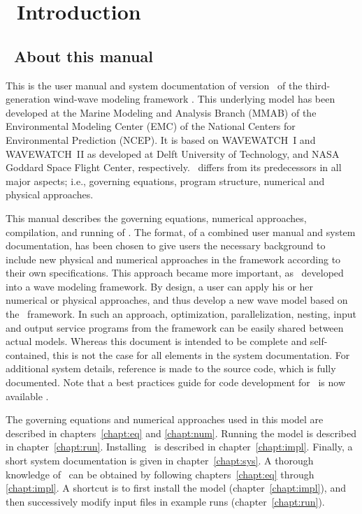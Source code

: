 \section{~Introduction}
\vssub
\subsection{~About this manual}
\vssub

This is the user manual and system documentation of version \WWver\ of the
 third-generation wind-wave modeling framework \ww. This underlying model has
 been developed at the Marine Modeling and Analysis Branch (MMAB) of the
 Environmental Modeling Center (EMC) of the National Centers for Environmental
 Prediction (NCEP). It is based on WAVEWATCH~I and WAVEWATCH~II as developed
 at Delft University of Technology, and NASA Goddard Space Flight Center,
 respectively. \ws\ differs from its predecessors in all major aspects; i.e.,
 governing equations, program structure, numerical and physical
 approaches. %

This manual describes the governing equations, numerical approaches,
compilation, and running of \ws. The format, of a combined user manual and
system documentation, has been chosen to give users the necessary background
to include new physical and numerical approaches in the framework according to
their own specifications.  This approach became more important, as \ws\
developed into a wave modeling framework. By design, a user can apply his or
her numerical or physical approaches, and thus develop a new wave model based
on the \ws\ framework. In such an approach, optimization, parallelization,
nesting, input and output service programs from the framework can be easily
shared between actual models.  Whereas this document is intended to be
complete and self-contained, this is not the case for all elements in the
system documentation. For additional system details, reference is made to the
source code, which is fully documented. Note that a best practices guide for
code development for \ws\ is now available \citep{tol:MMAB09b}.

The governing equations and numerical approaches used in this model are
described in chapters~\ref{chapt:eq} and \ref{chapt:num}. Running the model is
described in chapter~\ref{chapt:run}. Installing \ws\ is described in
chapter~\ref{chapt:impl}. Finally, a short system documentation is given in
chapter~\ref{chapt:sys}. A thorough knowledge of \ws\ can be obtained by
following chapters~\ref{chapt:eq} through \ref{chapt:impl}. A shortcut is to
first install the model (chapter~\ref{chapt:impl}), and then successively
modify input files in example runs (chapter~\ref{chapt:run}).

